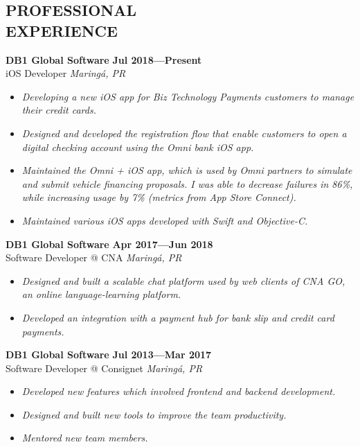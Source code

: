 \documentclass[line,margin]{res}
\begin{document}


\address{\sl marcosatanaka.com --- marcosatanaka@gmail.com}


\begin{resume}


\section{PROFESSIONAL \\ EXPERIENCE}
  {\bf DB1 Global Software} \hfill {\bf Jul 2018---Present} \\
  iOS Developer \hfill {\sl Maring\'a, PR}\\[-6pt]
  \begin{itemize}
      \item {\sl Developing a new iOS app for Biz Technology Payments customers to manage their credit cards.}
    \item {\sl Designed and developed the registration flow that enable customers to open a digital checking account using the Omni bank iOS app.}
    \item {\sl Maintained the Omni + iOS app, which is used by Omni partners to simulate and submit vehicle financing proposals. I was able to decrease failures in 86\%, while increasing usage by 7\% (metrics from App Store Connect).}
    \item {\sl Maintained various iOS apps developed with Swift and Objective-C.}
  \end{itemize}

  {\bf DB1 Global Software} \hfill {\bf Apr 2017---Jun 2018} \\
  Software Developer @ CNA \hfill {\sl Maring\'a, PR}\\[-6pt]
  \begin{itemize}
    \item {\sl Designed and built a scalable chat platform used by web clients of CNA GO,
                    an online language-learning platform.}
    \item {\sl Developed an integration with a payment hub for
               bank slip and credit card payments.}
  \end{itemize}

  {\bf DB1 Global Software} \hfill {\bf Jul 2013---Mar 2017} \\
  Software Developer @ Consignet \hfill {\sl Maring\'a, PR}\\[-6pt]
  \begin{itemize}
    \item {\sl Developed new features which involved
               frontend and backend development.}
    \item {\sl Designed and built new tools to improve the team productivity.}
    \item {\sl Mentored new team members.}
  \end{itemize}


\end{resume}
\end{document}
